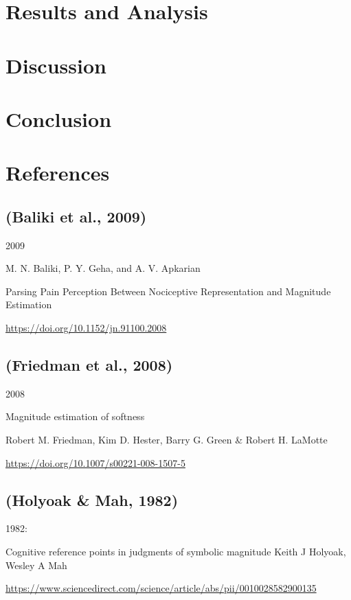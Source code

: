 \documentclass[11pt]{article}
\begin{document}
\section{Results and Analysis}
\label{sec:org1102c05}

\section{Discussion}
\label{sec:org9e22abc}

\section{Conclusion}
\label{sec:orgdd4c846}

\section{References}
\label{sec:orga381b1b}
\subsection{(Baliki et al., 2009)}
\label{sec:org704879c}

2009

M. N. Baliki, P. Y. Geha, and A. V. Apkarian

Parsing Pain Perception Between Nociceptive Representation and Magnitude Estimation

\url{https://doi.org/10.1152/jn.91100.2008}


\subsection{(Friedman et al., 2008)}
\label{sec:org87bd614}

2008

Magnitude estimation of softness

Robert M. Friedman, Kim D. Hester, Barry G. Green \& Robert H. LaMotte

\url{https://doi.org/10.1007/s00221-008-1507-5}


\subsection{(Holyoak \& Mah, 1982)}
\label{sec:orgd8cfcdf}

1982:


Cognitive reference points in judgments of symbolic magnitude
Keith J Holyoak, Wesley A Mah

\url{https://www.sciencedirect.com/science/article/abs/pii/0010028582900135}
\end{document}
